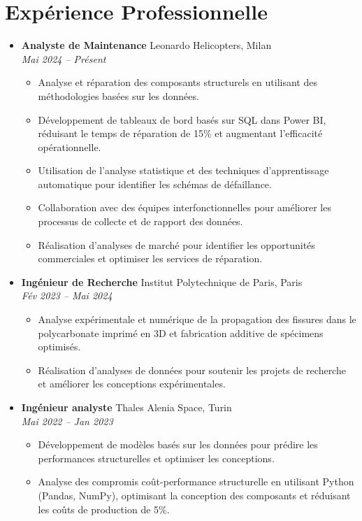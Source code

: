 \documentclass[letterpaper,10.5pt]{article}
\newcommand{\resumeEntry}[4]{
  \item\textbf{#1} \hfill #2\\
  \textit{#3} \hfill \textit{#4}
}
\newcommand{\resumeDescription}[1]{
  \vspace{-3pt}\begin{itemize}[leftmargin=0.2in]
    #1
  \end{itemize}
}
\begin{document}
\section*{Expérience Professionnelle}\vspace{-5pt}
\begin{itemize}[leftmargin=0.2in]
    \resumeEntry{Analyste de Maintenance}{Leonardo Helicopters, Milan}{Mai 2024 -- Présent}{}
    \resumeDescription{
        \item Analyse et réparation des composants structurels en utilisant des méthodologies basées sur les données.
        \item Développement de tableaux de bord basés sur SQL dans Power BI, réduisant le temps de réparation de 15\% et augmentant l'efficacité opérationnelle.
        \item Utilisation de l'analyse statistique et des techniques d'apprentissage automatique pour identifier les schémas de défaillance.
        \item Collaboration avec des équipes interfonctionnelles pour améliorer les processus de collecte et de rapport des données.
        \item Réalisation d'analyses de marché pour identifier les opportunités commerciales et optimiser les services de réparation.
    }
    \resumeEntry{Ingénieur de Recherche}{Institut Polytechnique de Paris, Paris}{Fév 2023 -- Mai 2024}{}
    \resumeDescription{
        \item Analyse expérimentale et numérique de la propagation des fissures dans le polycarbonate imprimé en 3D et fabrication additive de spécimens optimisés.
        \item Réalisation d'analyses de données pour soutenir les projets de recherche et améliorer les conceptions expérimentales.
    }
    \resumeEntry{Ingénieur analyste}{Thales Alenia Space, Turin}{Mai 2022 -- Jan 2023}{}
    \resumeDescription{
        \item Développement de modèles basés sur les données pour prédire les performances structurelles et optimiser les conceptions.
        \item Analyse des compromis coût-performance structurelle en utilisant Python (Pandas, NumPy), optimisant la conception des composants et réduisant les coûts de production de 5\%.
    }
\end{itemize}

\end{document}
